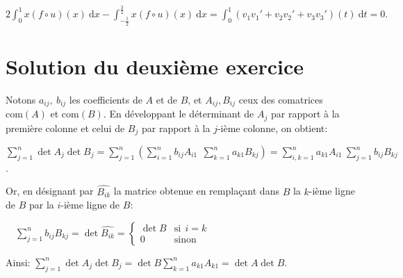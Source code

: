 $\displaystyle  2\int_0 ^1 x(f\circ  u)(x)\: \mathrm d x - \int_{-\frac 12}^{\frac 32} x(f\circ u) (x) \:\mathrm d x = \int_0^1 \left(v_1v_1'
+ v_2v_2'+v_3v_3' \right) (t) \:\mathrm d t =0.$ 

\section{ Solution du deuxième exercice} %

Notons $a_{ij}, \:b_{ij}$ les coefficients de $A$ et de $B$, et ${A_{ij}}, {B_{ij}}$ ceux des comatrices $\text {com}(A)$ et $\text{com}(B).$
En développant le déterminant de $A_j$ par rapport à la première colonne et celui de $B_j$ par rapport à la $j$-ième colonne, on obtient:

     $\displaystyle \sum _{j=1}^n \det {A_j} \det {B_j} = \sum _{j=1}^n\left(\sum _{i=1}^n  b_{i j}{A_{i 1}}\:\:\sum _{k=1}^n  a_{k1} {B_{k j}}\right)= \sum _{i,k =1}^n a_{k1}{A_{i1}}\:\sum_{j=1}^n b_{ij }{B_{kj}}$. 
 
 Or, en désignant par $\widehat{B_{ik}}$ la matrice obtenue en remplaçant dans $B$ la $k$-ième ligne de $B$ par la $i$-ième ligne de $B$:
 
 $\quad \displaystyle \sum _{j=1}^n  b_{ij}{B_{kj}}= \det {\widehat{B_{ik}}}= \left\{\begin{array} {cl} \det B & \text{si}\:\: i=k\\ 0& \text{sinon} \end{array} \right.$
 
 Ainsi: $\displaystyle \sum _{j=1}^n \det {A_j} \det {B_j}= \det{B}\sum _{k=1}^n a_{k1} A_{k1} = \det {A}\det{B}.$
